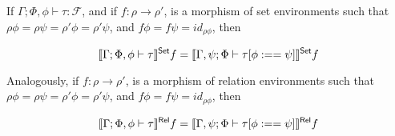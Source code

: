 \documentclass[acmsmall,review,anonymous]{acmart}
\theoremstyle{definition}
\newcommand{\F}{\mathcal{F}}
\renewcommand{\id}{\mathit{id}}
\begin{document}
\begin{thm}\label{thm:demotion-morph}
If $\Gamma; \Phi, \phi \vdash \tau : \F$, and if 
$f : \rho \to \rho'$, is a morphism of set environments such that
  $\rho \phi = \rho \psi = \rho' \phi = \rho' \psi$, and
   $f \phi = f \psi = \id_{\rho \phi}$, then

  $$\llbracket{\Gamma; \Phi, \phi \vdash \tau}\rrbracket^{\mathsf{Set}} f 
    = \llbracket{\Gamma, \psi; \Phi \vdash \tau[\phi :== \psi]}\rrbracket^{\mathsf{Set}} f $$

Analogously, if
$f : \rho \to \rho'$, is a morphism of relation environments such that
  $\rho \phi = \rho \psi = \rho' \phi = \rho' \psi$, and
   $f \phi = f \psi = \id_{\rho \phi}$, then

  $$\llbracket{\Gamma; \Phi, \phi \vdash \tau}\rrbracket^{\mathsf{Rel}} f 
    = \llbracket{\Gamma, \psi; \Phi \vdash \tau[\phi :== \psi]}\rrbracket^{\mathsf{Rel}} f $$

\end{thm}
\end{document}
